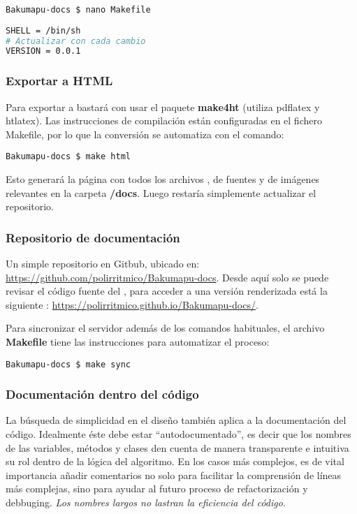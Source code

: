 \begin{lstlisting}
Bakumapu-docs $ nano Makefile
\end{lstlisting}
\begin{lstlisting}[language=bash]
SHELL = /bin/sh
# Actualizar con cada cambio
VERSION = 0.0.1
\end{lstlisting}

\subsubsection{Exportar a HTML}\label{flujo:exportar-a-html}
Para exportar a  bastará con usar el paquete \textbf{make4ht} (utiliza pdflatex y htlatex). Las instrucciones de compilación están configuradas en el fichero Makefile, por lo que la conversión se automatiza con el comando:
\begin{lstlisting}
Bakumapu-docs $ make html
\end{lstlisting}
Esto generará la página  con todos los archivos , de fuentes y de imágenes relevantes en la carpeta \textbf{/docs}. Luego restaría simplemente actualizar el repositorio.

\subsubsection{Repositorio de documentación}\label{flujo:repositorio-de-documentacion}
Un simple repositorio  en Gitbub, ubicado en: \url{https://github.com/polirritmico/Bakumapu-docs}. Desde aquí solo se puede revisar el código fuente del , para acceder a una versión renderizada está la siguiente : \url{https://polirritmico.github.io/Bakumapu-docs/}.

Para sincronizar el servidor además de los comandos  habituales, el archivo \textbf{Makefile} tiene las instrucciones para automatizar el proceso:
\begin{lstlisting}
Bakumapu-docs $ make sync
\end{lstlisting}

\subsubsection{Documentación dentro del código}\label{flujo:documentacion-en-codigo}
La búsqueda de simplicidad en el diseño también aplica a la documentación del código. Idealmente éste debe estar “autodocumentado”, es decir que los nombres de las variables, métodos y clases den cuenta de manera transparente e intuitiva su rol dentro de la lógica del algoritmo. En los casos más complejos, es de vital importancia añadir comentarios no solo para facilitar la comprensión de líneas más complejas, sino para ayudar al futuro proceso de refactorización y debbuging. \emph{Los nombres largos no lastran la eficiencia del código}.

